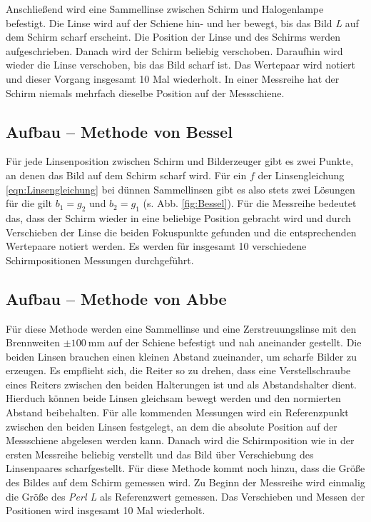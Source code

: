 Anschließend wird eine Sammellinse zwischen Schirm und Halogenlampe befestigt. Die Linse wird auf der Schiene hin- und her bewegt, bis das Bild \textit{L} auf dem Schirm scharf erscheint.
Die Position der Linse und des Schirms werden aufgeschrieben. Danach wird der Schirm beliebig verschoben. Daraufhin wird wieder die Linse verschoben, bis das Bild scharf ist.
Das Wertepaar wird notiert und dieser Vorgang insgesamt 10 Mal wiederholt. In einer Messreihe hat der Schirm niemals mehrfach dieselbe Position auf der Messschiene.

\subsection{Aufbau -- Methode von Bessel}
Für jede Linsenposition zwischen Schirm und Bilderzeuger gibt es zwei Punkte, an denen das Bild auf dem Schirm scharf wird. Für ein $f$ der Linsengleichung \eqref{eqn:Linsengleichung} bei dünnen Sammellinsen 
gibt es also stets zwei Lösungen für die gilt $b_1=g_2$ und $b_2=g_1$ (s. Abb. \ref{fig:Bessel}).
Für die Messreihe bedeutet das, dass der Schirm wieder in eine beliebige Position gebracht wird und durch Verschieben der Linse die beiden Fokuspunkte gefunden und die entsprechenden Wertepaare
notiert werden. Es werden für insgesamt 10 verschiedene Schirmpositionen Messungen durchgeführt.

\subsection{Aufbau -- Methode von Abbe}
Für diese Methode werden eine Sammellinse und eine Zerstreuungslinse mit den Brennweiten $\pm \SI{100}{\milli\meter}$ auf der Schiene befestigt und nah aneinander gestellt.
Die beiden Linsen brauchen einen kleinen Abstand zueinander, um scharfe Bilder zu erzeugen. Es empflieht sich, die Reiter so zu drehen, dass eine Verstellschraube eines Reiters zwischen
den beiden Halterungen ist und als Abstandshalter dient. Hierduch können beide Linsen gleichsam bewegt werden und den normierten Abstand beibehalten.
Für alle kommenden Messungen wird ein Referenzpunkt zwischen den beiden Linsen festgelegt, an dem die absolute Position auf der Messschiene abgelesen werden kann.
Danach wird die Schirmposition wie in der ersten Messreihe beliebig verstellt und das Bild über Verschiebung des Linsenpaares scharfgestellt. Für diese Methode kommt noch hinzu, dass die Größe des Bildes auf dem Schirm gemessen wird. Zu Beginn der Messreihe wird einmalig die Größe des \textit{Perl L} als Referenzwert gemessen.
Das Verschieben und Messen der Positionen wird insgesamt 10 Mal wiederholt.